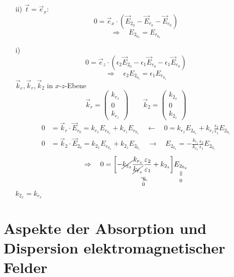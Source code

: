 \begin{enumerate}
	\item[ii)] $ \vec{t} = \vec{e}_x: $
	\begin{equation*}
	0 = \vec{e}_x \cdot (\vec{E}_{2_0} - \vec{E}_{r_0} - \vec{E}_{e_0})
	\end{equation*}
	\begin{equation*}
	\Rightarrow \quad E_{2_{0_x}} = E_{r_{0_x}}
	\end{equation*}
	\item[i)]
	\begin{equation*}
	0 = \vec{e}_z \cdot (\epsilon_2 \vec{E}_{2_0} - \epsilon_1 \vec{E}_{r_0} - \epsilon_1 \vec{E}_{e_0})
	\end{equation*}
	\begin{equation*}
	\Rightarrow \quad \epsilon_2 E_{2_{0_z}} = \epsilon_1 E_{r_{0_z}}
	\end{equation*}
	$ \vec{k}_e, \vec{k}_r, \vec{k}_2 $ in $ x $-$ z $-Ebene
	\begin{equation*}
	\vec{k}_r = \begin{pmatrix}
	k_{r_x} \\ 0 \\ k_{r_z}
	\end{pmatrix} \qquad \vec{k}_2 = \begin{pmatrix}
	k_{2_x} \\ 0 \\ k_{2_z}
	\end{pmatrix}
	\end{equation*}
	\begin{align*}
	0 &= \vec{k}_r \cdot \vec{E}_{r_0} = k_{r_x} E_{r_{0_x}} + k_{r_z} E_{r_{0_z}} \quad \leftarrow \quad 0 = k_{r_x} E_{2_{0_x}} + k_{r_z} \frac{\epsilon_2}{\epsilon_1} E_{2_{0_z}} \\
	0 &= \vec{k}_2 \cdot \vec{E}_{2_0} = k_{2_x} E_{e_{0_x}} + k_{2_z} E_{2_{0_z}} \quad \rightarrow \quad E_{2_{0_x}} = - \frac{k_{r_z}}{k_{r_x}} \frac{\epsilon_2}{\epsilon_1} E_{2_{0_z}}
	\end{align*}
	\begin{equation*}
	\Rightarrow \quad 0 = \custo{\neq}{\left[- \cancel{k_{z_x}} \frac{k_{r_z}}{\cancel{k_{r_x}}} \frac{\epsilon_2}{\epsilon_1} + k_{2_z}\right]}{0} \equalto{E_{2_{0_z}}}{0}
	\end{equation*}
	$ k_{2_x} = k_{r_x} $
\end{enumerate}


\section{Aspekte der Absorption und Dispersion elektromagnetischer Felder}

